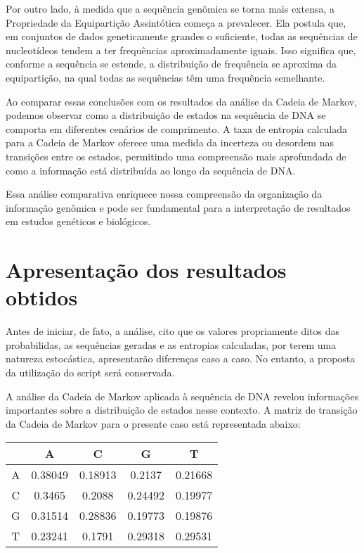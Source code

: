 \documentclass{article}
\begin{document}
\begin{enumerate}
    Por outro lado, à medida que a sequência genômica se torna mais extensa, a Propriedade da Equipartição Assintótica começa a prevalecer. Ela postula que, em conjuntos de dados geneticamente grandes o suficiente, todas as sequências de nucleotídeos tendem a ter frequências aproximadamente iguais. Isso significa que, conforme a sequência se estende, a distribuição de frequência se aproxima da equipartição, na qual todas as sequências têm uma frequência semelhante.

    Ao comparar essas conclusões com os resultados da análise da Cadeia de Markov, podemos observar como a distribuição de estados na sequência de DNA se comporta em diferentes cenários de comprimento. A taxa de entropia calculada para a Cadeia de Markov oferece uma medida da incerteza ou desordem nas transições entre os estados, permitindo uma compreensão mais aprofundada de como a informação está distribuída ao longo da sequência de DNA.

    Essa análise comparativa enriquece nossa compreensão da organização da informação genômica e pode ser fundamental para a interpretação de resultados em estudos genéticos e biológicos.

    
\end{enumerate}


\section{Apresentação dos resultados obtidos}

     Antes de iniciar, de fato, a análise, cito que os valores propriamente ditos das probabilidas, as sequências geradas e as entropias calculadas, por terem uma natureza estocástica, apresentarão diferenças caso a caso. No entanto, a proposta da utilização do script será conservada.

    A análise da Cadeia de Markov aplicada à sequência de DNA revelou informações importantes sobre a distribuição de estados nesse contexto. A matriz de transição da Cadeia de Markov para o presente caso está representada abaixo:

    \begin{center}
    \begin{tabular}{|c|c|c|c|c|}
    \hline
     & A & C & G & T \\
    \hline
    A & 0.38049 & 0.18913 & 0.2137 & 0.21668 \\
    C & 0.3465 & 0.2088 & 0.24492 & 0.19977 \\
    G & 0.31514 & 0.28836 & 0.19773 & 0.19876 \\
    T & 0.23241 & 0.1791 & 0.29318 & 0.29531 \\
    \hline
    \end{tabular}
    \end{center}
    
\end{document}
